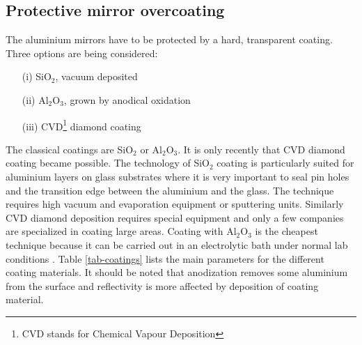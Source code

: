 \subsection{Protective mirror overcoating}


\medskip

The aluminium mirrors have to be protected by a hard, transparent coating. Three
options are being considered:

\begin{itemize}
\item[(i)]  SiO$_{2}$, vacuum deposited

\item[(ii)]  Al$_{2}$O$_{3}$, grown by anodical oxidation

\item[(iii)]  CVD\footnote{%
CVD stands for Chemical Vapour Deposition} diamond coating
\end{itemize}

The classical coatings are SiO$_{2}$ or Al$_{2}$O$_{3}$. It is only recently
that CVD diamond coating became possible. The technology of SiO$_{2}$
coating is particularly suited for aluminium layers on glass substrates where it is
very important to seal pin holes and the transition edge between the aluminium and the
glass. The technique requires high vacuum and evaporation equipment or
sputtering units. Similarly CVD diamond deposition requires special
equipment and only a few companies are specialized in coating large areas.
Coating with Al$_{2}$O$_{3}$ is the cheapest technique because it can be
carried out in an electrolytic bath under normal lab conditions 
\cite{haas:49,harris:92,loh:93,cresti:96}.
Table \ref{tab-coatings} lists
the main parameters for the different coating materials. It should be noted
that anodization removes some aluminium from the surface and reflectivity is
more affected by deposition of coating material.

